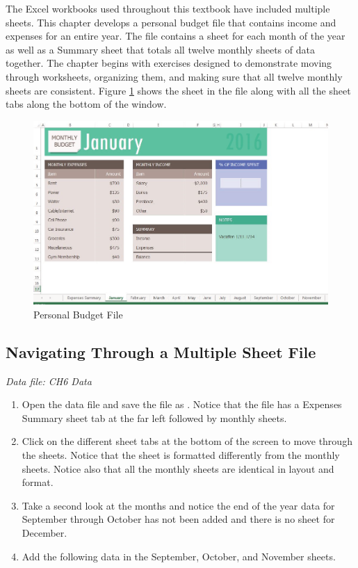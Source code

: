 The Excel workbooks used throughout this textbook have included multiple sheets. This chapter develops a personal budget file that contains income and expenses for an entire year. The file contains a sheet for each month of the year as well as a Summary sheet that totals all twelve monthly sheets of data together. The chapter begins with exercises designed to demonstrate moving through worksheets, organizing them, and making sure that all twelve monthly sheets are consistent. Figure \ref{06:fig01} shows the  sheet in the  file along with all the sheet tabs along the bottom of the window.

\begin{figure}[H]
	\centering
	\includegraphics[width=\maxwidth{.95\linewidth}]{gfx/ch06_fig01}
	\caption{Personal Budget File}
	\label{06:fig01}
\end{figure}

\subsection{Navigating Through a Multiple Sheet File}

\textit{Data file: CH6 Data}

\begin{enumerate}
	\item Open the data file  and save the file as . Notice that the file has a Expenses Summary sheet tab at the far left followed by monthly sheets.
	\item Click on the different sheet tabs at the bottom of the screen to move through the sheets. Notice that the  sheet is formatted differently from the monthly sheets. Notice also that all the monthly sheets are identical in layout and format.
	\item Take a second look at the months and notice the end of the year data for September through October has not been added and there is no sheet for December. 
	\item Add the following data in the September, October, and November sheets.
\end{enumerate}

